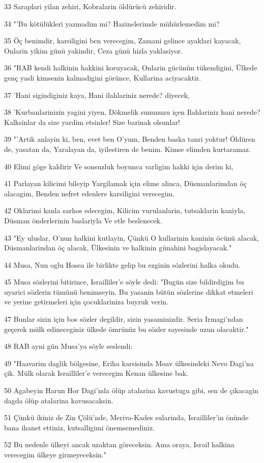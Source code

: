\par 33 Saraplari yilan zehiri, Kobralarin öldürücü zehiridir.
\par 34 "'Bu kötülükleri yazmadim mi? Hazinelerimde mühürlemedim mi?
\par 35 Öç benimdir, karsiligini ben verecegim, Zamani gelince ayaklari kayacak, Onlarin yikim günü yakindir, Ceza günü hizla yaklasiyor.
\par 36 "RAB kendi halkinin hakkini koruyacak, Onlarin gücünün tükendigini, Ülkede genç yasli kimsenin kalmadigini görünce, Kullarina aciyacaktir.
\par 37 'Hani sigindiginiz kaya, Hani ilahlariniz nerede? diyecek,
\par 38 'Kurbanlarinizin yagini yiyen, Dökmelik sununuzu içen Ilahlariniz hani nerede? Kalksinlar da size yardim etsinler! Size barinak olsunlar!
\par 39 "'Artik anlayin ki, ben, evet ben O'yum, Benden baska tanri yoktur! Öldüren de, yasatan da, Yaralayan da, iyilestiren de benim. Kimse elimden kurtaramaz.
\par 40 Elimi göge kaldirir Ve sonsuzluk boyunca varligim hakki için derim ki,
\par 41 Parlayan kilicimi bileyip Yargilamak için elime alinca, Düsmanlarimdan öç alacagim, Benden nefret edenlere karsiligini verecegim.
\par 42 Oklarimi kanla sarhos edecegim, Kilicim vurulanlarin, tutsaklarin kaniyla, Düsman önderlerinin baslariyla Ve etle beslenecek.
\par 43 "Ey uluslar, O'nun halkini kutlayin, Çünkü O kullarinin kaninin öcünü alacak, Düsmanlarindan öç alacak, Ülkesinin ve halkinin günahini bagislayacak."
\par 44 Musa, Nun oglu Hosea ile birlikte gelip bu ezginin sözlerini halka okudu.
\par 45 Musa sözlerini bitirince, Israilliler'e söyle dedi: "Bugün size bildirdigim bu uyarici sözlerin tümünü benimseyin. Bu yasanin bütün sözlerine dikkat etmeleri ve yerine getirmeleri için çocuklariniza buyruk verin.
\par 47 Bunlar sizin için bos sözler degildir, sizin yasaminizdir. Seria Irmagi'ndan geçerek mülk edineceginiz ülkede ömrünüz bu sözler sayesinde uzun olacaktir."
\par 48 RAB ayni gün Musa'ya söyle seslendi:
\par 49 "Haavarim daglik bölgesine, Eriha karsisinda Moav ülkesindeki Nevo Dagi'na çik. Mülk olarak Israilliler'e verecegim Kenan ülkesine bak.
\par 50 Agabeyin Harun Hor Dagi'nda ölüp atalarina kavustugu gibi, sen de çikacagin dagda ölüp atalarina kavusacaksin.
\par 51 Çünkü ikiniz de Zin Çölü'nde, Meriva-Kades sularinda, Israilliler'in önünde bana ihanet ettiniz, kutsalligimi önemsemediniz.
\par 52 Bu nedenle ülkeyi ancak uzaktan göreceksin. Ama oraya, Israil halkina verecegim ülkeye girmeyeceksin."

